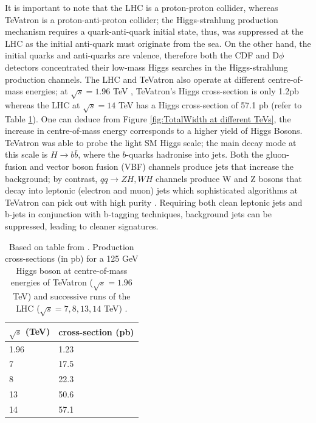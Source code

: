 \documentclass[a4paper,11pt]{article}
\begin{document}
It is important to note that the LHC is a proton-proton collider, whereas TeVatron is a proton-anti-proton collider; the Higgs-strahlung production mechanism requires a quark-anti-quark initial state, thus, was suppressed at the LHC as the initial anti-quark must originate from the sea. On the other hand, the initial quarks and anti-quarks are valence, therefore both the CDF and D$\phi$ detectors concentrated their low-mass Higgs searches in the Higgs-strahlung production channels. The LHC and TeVatron also operate at different centre-of-mass energies; at $\sqrt{s} = 1.96$ TeV , TeVatron's Higgs cross-section is only 1.2pb whereas the LHC at $\sqrt{s} = 14$ TeV has a Higgs cross-section of 57.1 pb (refer to Table \ref{tab:HiggsCrossection}). One can deduce from Figure \ref{fig:TotalWidth at different TeVs}, the increase in centre-of-mass energy corresponds to a higher yield of Higgs Bosons. TeVatron was able to probe the light SM Higgs scale; the main decay mode at this scale is $H \rightarrow b\bar{b}$, where the $b$-quarks hadronise into jets. Both the gluon-fusion and vector boson fusion (VBF) channels produce jets that increase the background; by contrast, $qq \rightarrow ZH, WH$ channels produce W and Z bosons that decay into leptonic (electron and muon) jets which sophisticated algorithms at TeVatron can pick out with high purity \cite{D0:2013xld}. Requiring both clean leptonic jets and b-jets in conjunction with b-tagging techniques, background jets can be suppressed, leading to cleaner signatures.\\



\begin{table}[tb]
	\centering
	\caption{Based on table from \cite{Carena:2016hpv}. Production cross-sections (in pb) for a 125 GeV Higgs boson at centre-of-mass energies of TeVatron ($\sqrt{s} = 1.96$ TeV) and successive runs of the LHC ($\sqrt{s} = 7, 8, 13, 14$ TeV) .}
	\label{tab:HiggsCrossection}
	\begin{tabularx}{0.5\textwidth}{@{}l l@{}}
		\toprule
		\textbf{$\sqrt{s}$ (TeV)} & cross-section \textbf{(pb)}\\
		\midrule
		1.96  & 1.23 \\
		7  & 17.5 \\
		8  & 22.3 \\
		13 & 50.6 \\
		14 & 57.1 \\
		\bottomrule
	\end{tabularx}
\end{table}
\end{document}
